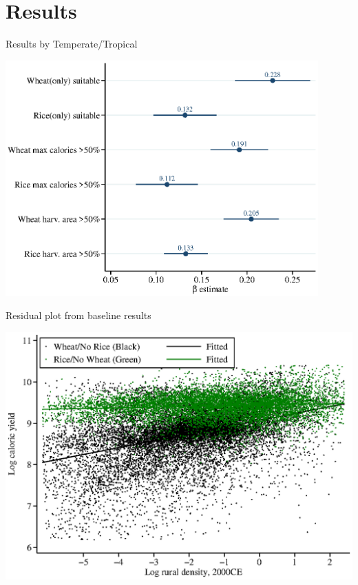 \documentclass[10pt, xcolor=dvipsnames]{beamer}
\begin{document}
\section{Results}

\begin{frame}{Results by Temperate/Tropical}\label{crop}
\begin{center}
\includegraphics[width=0.9\textwidth]{fig_coef_crop_base.eps}
\end{center}
\hfill \hyperlink{cropreg}{}
\end{frame}

\begin{frame}{Residual plot from baseline results}
\begin{center}
\includegraphics[width=.9\textwidth]{fig_beta_crop.eps}
\end{center}
\end{frame}
\end{document}
